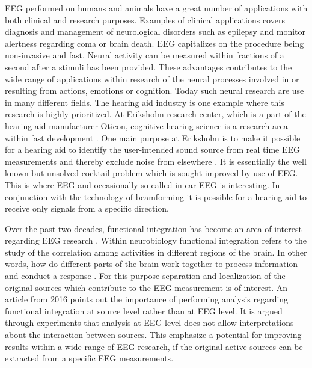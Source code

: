\noindent
EEG performed on humans and animals have a great number of applications with both clinical and research purposes. 
Examples of clinical applications covers diagnosis and management of neurological disorders such as epilepsy and monitor alertness regarding coma or brain death.
EEG capitalizes on the procedure being non-invasive and fast.
Neural activity can be measured within fractions of a second after a stimuli has been provided. 
These advantages contributes to the wide range of applications within research of the neural processes involved in or resulting from actions, emotions or  cognition. Today such neural research are use in many different fields\cite[p. 4]{fundamentalEEG}.
The hearing aid industry is one example where this research is highly prioritized. 
At Eriksholm research center, which is a part of the hearing aid manufacturer Oticon, cognitive hearing science is a research area within fast development \cite{Weberik}. 
One main purpose at Eriksholm is to make it possible for a hearing aid to identify the user-intended sound source from real time EEG measurements and thereby exclude noise from elsewhere \cite{Emina2019} \cite{Bech2018}. 
It is essentially the well known but unsolved cocktail problem which is sought improved by use of EEG. 
This is where EEG and occasionally so called in-ear EEG is interesting. In conjunction with the technology of beamforming it is possible for a hearing aid to receive only signals from a specific direction. 

Over the past two decades, functional integration has become an area of interest regarding EEG research \cite{Friston2011}. 
Within neurobiology functional integration refers to the study of the correlation among activities in different regions of the brain. 
In other words, how do different parts of the brain work together to process information and conduct a response \cite{Friston2002}.     
For this purpose separation and localization of the original sources which contribute to the EEG measurement is of interest. 
An article from 2016 \cite{Van2019} points out the importance of performing analysis regarding functional integration at source level rather than at EEG level. 
It is argued through experiments that analysis at EEG level does not allow interpretations about the interaction between sources. 
This emphasize a potential for improving results within a wide range of EEG research, if the original active sources can be extracted from a specific EEG measurements.    

